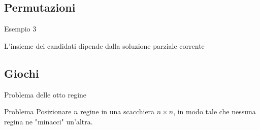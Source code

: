\subsection{Permutazioni}

\begin{frame}{Esempio 3}

\BI
\item L'insieme dei candidati dipende dalla soluzione parziale corrente
\EI

\begin{Procedure}
\caption[A]{\permutazioni(\Set $A$, \INTEGER $n$, $\Item[\,]\ S$, \INTEGER\ $i$)}
\end{Procedure}

	
	
	
\end{frame}


\subsection{Giochi}

\begin{frame}{Problema delle otto regine}

\vspace{-12pt}
\begin{block}{Problema}
Posizionare $n$ regine in una scacchiera $n \times n$, in modo tale che 
nessuna regina ne "minacci" un'altra. 
\end{block}

\end{frame}

